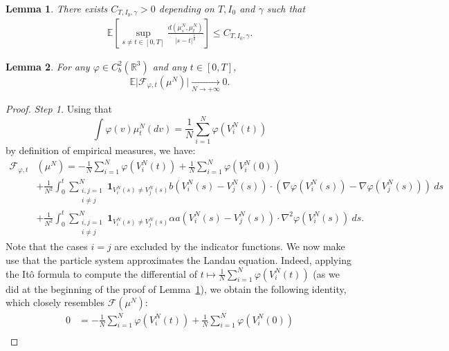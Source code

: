 \documentclass[10pt,a4paper]{amsart}
\newtheorem{lemma}{Lemma}
\begin{document}
\begin{lemma}
    \label{lem:holdercont}
    There exists $C_{T,I_0,\gamma}>0$ depending on $T,I_0$ and $\gamma$ such that 
    \begin{align*}
   \mathbb{E}\left[  \sup_{s\neq t\in[0,T]} \frac{d(\mu^N_s,\mu^N_t)}{\vert s-t \vert^\frac{1}{8}} \right]\leq C_{T,I_0,\gamma}.
\end{align*}
\end{lemma}

\begin{lemma}
    \label{aswsolution-empirical measures}
    For any $\varphi\in C^2_b(\mathbb{R}^3)$ and any $t\in[0,T]$,
    $$\mathbb{E}\vert \mathcal{F}_{\varphi,t}(\mu^N)\vert\xrightarrow[N\rightarrow+\infty]{}0.$$
\end{lemma}

\begin{proof}
    \textit{Step 1.} Using that
    $$\int \varphi(v)\mu^N_t(dv)=\frac{1}{N}\sum_{i=1}^N\varphi(V^N_i(t))$$
    by definition of empirical measures, we have:
    \begin{align}
    \label{eq:Fagainstempiricalmeasures1}
    \mathcal{F}_{\varphi,t}&(\mu^N) = -\frac{1}{N} \sum_{i=1}^N\varphi(V^N_i(t)) + \frac{1}{N} \sum_{i=1}^N\varphi(V^N_i(0))\\
    \label{eq:Fagainstempiricalmeasures2}
    &+ \frac{1}{N^2}\int_0^t \sum_{\substack{i,j=1\\ i\neq j}}^N \mathbf{1}_{V^N_i(s)\neq V^N_j(s)}b(V^N_i(s)-V^N_j(s)) \cdot (\nabla\varphi(V^N_i(s))-\nabla\varphi(V^N_j(s)))\ ds\\
    \label{eq:Fagainstempiricalmeasures3}
    &+\frac{1}{N^2} \int_0^t \sum_{\substack{i,j=1\\ i\neq j}}^N \mathbf{1}_{V^N_i(s)\neq V^N_j(s)}\alpha a(V^N_i(s)-V^N_j(s)) \cdot \nabla^2\varphi(V^N_i(s))\ ds.
    \end{align}  
    Note that the cases $i=j$ are excluded by the indicator functions. We now make use that the particle system approximates the Landau equation. Indeed, applying the Itô formula to compute the differential of $t \mapsto \frac{1}{N}\sum_{i=1}^N\varphi(V^N_i(t))$ (as we did at the beginning of the proof of Lemma~\ref{lem:holdercont}), we obtain the following identity, which closely resembles $\mathcal{F}(\mu^N)$:
    \begin{align}
    \label{eq:Itôempiricalmeasures1}
       0 &= -\frac{1}{N}\sum_{i=1}^N\varphi(V^N_i(t))+\frac{1}{N}\sum_{i=1}^N\varphi(V^N_i(0)) \\
       \label{eq:Itôempiricalmeasures2}

\end{align}
\end{proof}
\end{document}
